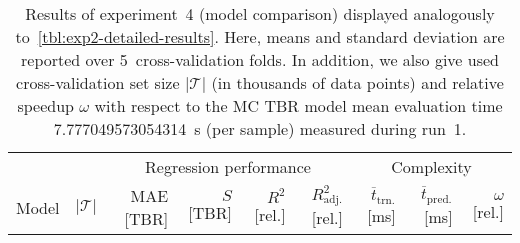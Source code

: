 \begin{table}[!hbt]
	\centering
	\setlength\tabcolsep{4pt}
	{\scriptsize
		\begin{tabular}{lrrrrrrrr}
		\toprule
		{} & {} & \multicolumn{4}{c}{Regression performance} &
		\multicolumn{3}{c}{Complexity}\\
		\cmidrule(lr){3-6}
		\cmidrule(lr){7-9}
		Model & $|\mathcal{T}|$ & MAE [TBR] & $S$ [TBR] & $R^2$ [rel.] & $R^2_{\text{adj.}}$ [rel.]
						& $\overline{t}_{\text{trn.}}$ [\si{\milli\second}] &
		$\overline{t}_{\text{pred.}}$ [\si{\milli\second}] & $\omega$ [rel.]\\
		\midrule
		
		\bottomrule
		\end{tabular}
	}
	\caption{Results of experiment~4 (model comparison) displayed analogously
		to~\cref{tbl:exp2-detailed-results}. Here, means and standard deviation
		are reported over 5~cross-validation folds. In addition, we also give
		used cross-validation set size $|\mathcal{T}|$ (in thousands of data
		points) and relative speedup $\omega$ with respect to the
		MC TBR model mean evaluation time \SI{7.777049573054314}{\second} (per
		sample) measured during run~1.}
	\label{tbl:exp4-detailed-results}
\end{table}

